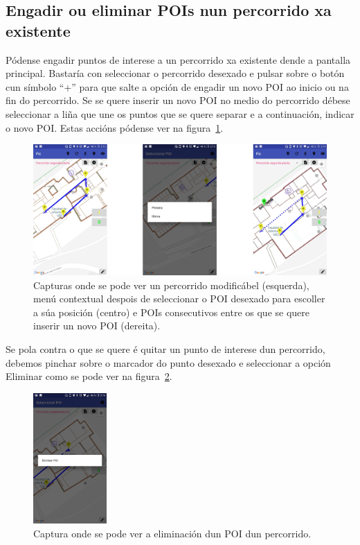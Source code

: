 \subsection{Engadir ou eliminar POIs nun percorrido xa existente}
Pódense engadir puntos de interese a un percorrido xa existente dende a pantalla principal. Bastaría con seleccionar o percorrido desexado e pulsar sobre o botón cun símbolo ``+'' para que salte a opción de engadir un novo POI ao inicio ou na fin do percorrido. Se se quere inserir un novo POI no medio do percorrido débese seleccionar a liña que une os puntos que se quere separar e a continuación, indicar o novo POI. Estas accións pódense ver na figura~\ref{fig:mapaEngadirPoiPercorrido}.

\begin{figure}[H]
	\begin{center}
		\includegraphics[width=1\textwidth]{figures/android/mapaEngadirPoiPercorrido}
		\caption{Capturas onde se pode ver un percorrido modificábel (esquerda), menú contextual despois de seleccionar o POI desexado para escoller a súa posición (centro) e POIs consecutivos entre os que se quere inserir un novo POI (dereita).}
		\label{fig:mapaEngadirPoiPercorrido}
	\end{center}
\end{figure}

Se pola contra o que se quere é quitar un punto de interese dun percorrido, debemos pinchar sobre o marcador do punto desexado e seleccionar a opción Eliminar como se pode ver na figura~\ref{fig:mapaEliminarPoiPercorrido}.

\begin{figure}[h]
	\begin{center}
		\includegraphics[width=0.25\textwidth]{figures/android/mapaEliminarPoiPercorrido}
		\caption{Captura onde se pode ver a eliminación dun POI dun percorrido.}
		\label{fig:mapaEliminarPoiPercorrido}
	\end{center}
\end{figure}

